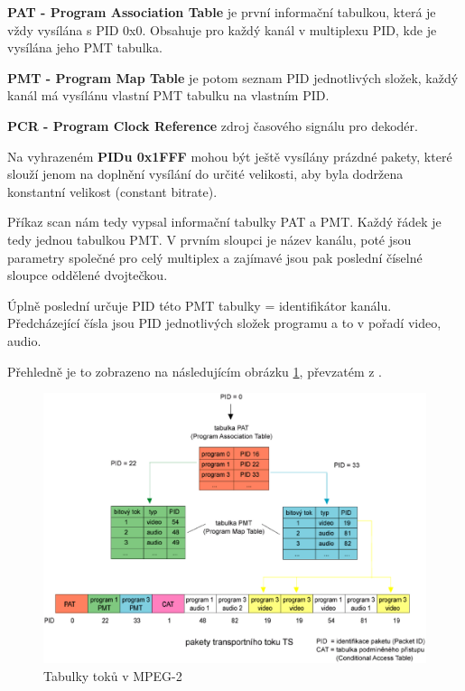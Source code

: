 \textbf{PAT - Program Association Table} je první informační tabulkou, která je vždy vysílána s PID 0x0. Obsahuje pro každý kanál v multiplexu PID, kde je vysílána jeho PMT tabulka.

\textbf{PMT - Program Map Table} je potom seznam PID jednotlivých složek, každý kanál má vysílánu vlastní PMT tabulku na vlastním PID.

\textbf{PCR - Program Clock Reference} zdroj časového signálu pro dekodér.

Na vyhrazeném \textbf{PIDu 0x1FFF} mohou být ještě vysílány prázdné pakety, které slouží jenom na doplnění vysílání do určité velikosti, aby byla dodržena konstantní velikost (constant bitrate).

\vspace{10pt}

Příkaz scan nám tedy vypsal informační tabulky PAT a PMT. Každý řádek je tedy jednou tabulkou PMT. V prvním sloupci je název kanálu, poté jsou parametry společné pro celý multiplex a zajímavé jsou pak poslední číselné sloupce oddělené dvojtečkou.

\vspace{10pt}

Úplně poslední určuje PID této PMT tabulky = identifikátor kanálu.
Předcházející čísla jsou PID jednotlivých složek programu a to v pořadí video, audio.

\vspace{10pt}

Přehledně je to zobrazeno na následujícím obrázku \ref{fig:PATaPMT}, převzatém z \cite{digitvURL}.

\vspace{10pt}

\begin{figure}[ht]
\begin{center}
\includegraphics[width=15cm]{images/PATaPMT.eps}
\caption{Tabulky toků v MPEG-2}
\label{fig:PATaPMT}
\end{center}
\end{figure}

